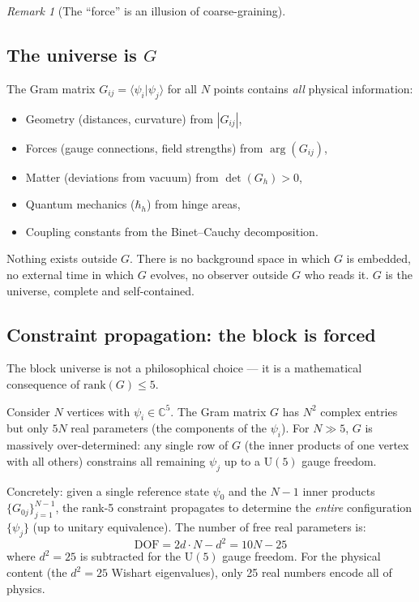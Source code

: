 \documentclass[12pt]{article}
\theoremstyle{remark}
\newtheorem{remark}[theorem]{Remark}
\theoremstyle{definition}
\newcommand{\CC}{\mathbb{C}}
\begin{document}
\begin{remark}[The ``force'' is an illusion of coarse-graining]
\subsection{The universe is $G$}

The Gram matrix $G_{ij} = \langle\psi_i|\psi_j\rangle$ for all $N$ points contains \emph{all} physical information:
\begin{itemize}
\item Geometry (distances, curvature) from $|G_{ij}|$,
\item Forces (gauge connections, field strengths) from $\arg(G_{ij})$,
\item Matter (deviations from vacuum) from $\det(G_h) > 0$,
\item Quantum mechanics ($\hbar_h$) from hinge areas,
\item Coupling constants from the Binet--Cauchy decomposition.
\end{itemize}

Nothing exists outside $G$. There is no background space in which $G$ is embedded, no external time in which $G$ evolves, no observer outside $G$ who reads it. $G$ is the universe, complete and self-contained.

\subsection{Constraint propagation: the block is forced}

The block universe is not a philosophical choice --- it is a mathematical consequence of $\text{rank}(G) \leq 5$.

Consider $N$ vertices with $\psi_i \in \CC^5$. The Gram matrix $G$ has $N^2$ complex entries but only $5N$ real parameters (the components of the $\psi_i$). For $N \gg 5$, $G$ is massively over-determined: any single row of $G$ (the inner products of one vertex with all others) constrains all remaining $\psi_j$ up to a $\text{U}(5)$ gauge freedom.

Concretely: given a single reference state $\psi_0$ and the $N - 1$ inner products $\{G_{0j}\}_{j=1}^{N-1}$, the rank-5 constraint propagates to determine the \emph{entire} configuration $\{\psi_j\}$ (up to unitary equivalence). The number of free real parameters is:
\begin{equation}
\text{DOF} = 2d \cdot N - d^2 = 10N - 25
\end{equation}
where $d^2 = 25$ is subtracted for the $\text{U}(5)$ gauge freedom. For the physical content (the $d^2 = 25$ Wishart eigenvalues), only 25 real numbers encode all of physics.


\end{remark}
\end{document}
